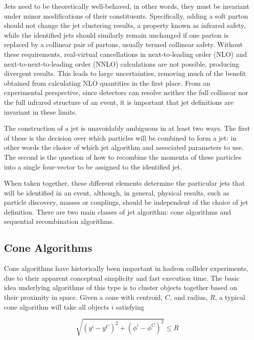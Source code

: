 Jets need to be theoretically well-behaved, in other words, they must be invariant under minor modifications of their constituents.
Specifically, adding a soft parton should not change the jet clustering results, a property known as infrared safety, while the identified jets should similarly remain unchanged if one parton is replaced by a collinear pair of partons, usually termed collinear safety.
Without these requirements, real-virtual cancellations in next-to-leading order (NLO) and next-to-next-to-leading order (NNLO) \QCD calculations are not possible, producing divergent results.
This leads to large uncertainties, removing much of the benefit obtained from calculating NLO quantities in the first place.
From an experimental perspective, since detectors can resolve neither the full collinear nor the full infrared structure of an event, it is important that jet definitions are invariant in these limits.

The construction of a jet is unavoidably ambiguous in at least two ways.
The first of these is the decision over which particles will be combined to form a jet: in other words the choice of which jet algorithm and associated parameters to use.
The second is the question of how to recombine the momenta of these particles into a single four-vector to be assigned to the identified jet.

When taken together, these different elements determine the particular jets that will be identified in an event, although, in general, physical results, such as particle discovery, masses or couplings, should be independent of the choice of jet definition.
There are two main classes of jet algorithm: cone algorithms and sequential recombination algorithms.

\subsection{Cone Algorithms}
Cone algorithms have historically been important in hadron collider experiments, due to their apparent conceptual simplicity and fast execution time.
The basic idea underlying algorithms of this type is to cluster objects together based on their proximity in \yphi space. Given a cone with centroid, $C$, and radius, $R$, a typical cone algorithm will take all objects $i$ satisfying

\begin{equation}
  \sqrt{ \left(y^i-y^C\right)^2 + \left(\phi^i-\phi^C\right)^2 } \leq R
\end{equation}

